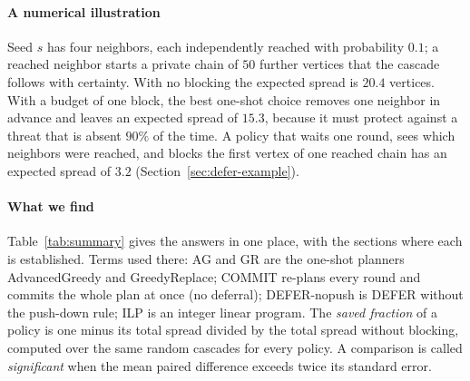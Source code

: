 \documentclass[preprint,11pt]{elsarticle}
\theoremstyle{definition}
\theoremstyle{remark}
\begin{document}
\paragraph{A numerical illustration} Seed $s$ has four neighbors, each independently reached with probability $0.1$; a reached neighbor starts a private chain of $50$ further vertices that the cascade follows with certainty. With no blocking the expected spread is $20.4$ vertices. With a budget of one block, the best one-shot choice removes one neighbor in advance and leaves an expected spread of $15.3$, because it must protect against a threat that is absent $90\%$ of the time. A policy that waits one round, sees which neighbors were reached, and blocks the first vertex of one reached chain has an expected spread of $3.2$ (Section~\ref{sec:defer-example}).

\paragraph{What we find} Table~\ref{tab:summary} gives the answers in one place, with the sections where each is established. Terms used there: AG and GR are the one-shot planners AdvancedGreedy and GreedyReplace; COMMIT re-plans every round and commits the whole plan at once (no deferral); DEFER-nopush is DEFER without the push-down rule; ILP is an integer linear program. The \emph{saved fraction} of a policy is one minus its total spread divided by the total spread without blocking, computed over the same random cascades for every policy. A comparison is called \emph{significant} when the mean paired difference exceeds twice its standard error.
\end{document}
